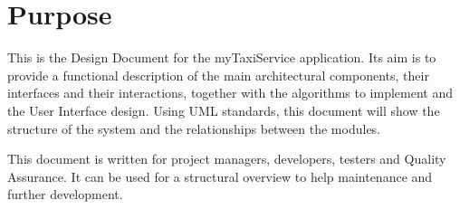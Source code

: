 \section{Purpose}
\label{sec:purpose}

This is the Design Document for the myTaxiService application. Its aim is to provide a functional description of the main architectural components, their interfaces and their interactions, together with the algorithms to implement and the User Interface design.
Using UML standards, this document will show the structure of the system and the relationships between the modules.

This document is written for project managers, developers, testers and Quality Assurance. It can be used for a structural overview to help maintenance and further development.
